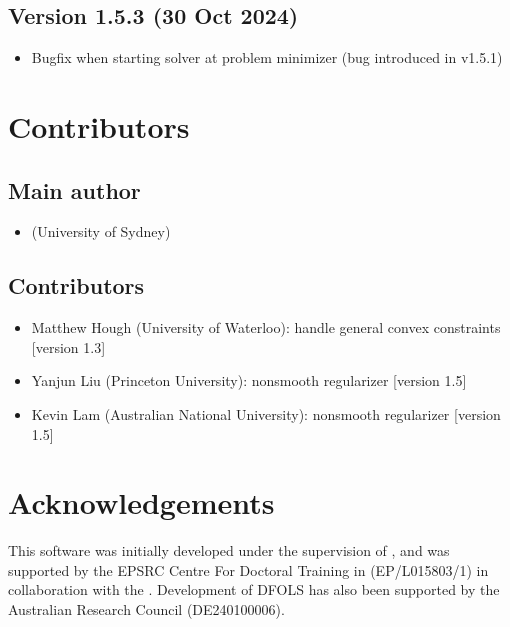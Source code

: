 \documentclass[letterpaper,10pt,english]{sphinxmanual}
\begin{document}
\section{Version 1.5.3 (30 Oct 2024)}
\label{\detokenize{history:version-1-5-3-30-oct-2024}}\begin{itemize}
\item {} 
\sphinxAtStartPar
Bugfix when starting solver at problem minimizer (bug introduced in v1.5.1)

\end{itemize}

\sphinxstepscope


\chapter{Contributors}
\label{\detokenize{contributors:contributors}}\label{\detokenize{contributors::doc}}

\section{Main author}
\label{\detokenize{contributors:main-author}}\begin{itemize}
\item {} 
\sphinxAtStartPar
{} (University of Sydney)

\end{itemize}


\section{Contributors}
\label{\detokenize{contributors:id1}}\begin{itemize}
\item {} 
\sphinxAtStartPar
Matthew Hough (University of Waterloo): handle general convex constraints {[}version 1.3{]}

\item {} 
\sphinxAtStartPar
Yanjun Liu (Princeton University): nonsmooth regularizer {[}version 1.5{]}

\item {} 
\sphinxAtStartPar
Kevin Lam (Australian National University): nonsmooth regularizer {[}version 1.5{]}

\end{itemize}


\chapter{Acknowledgements}
\label{\detokenize{index:acknowledgements}}
\sphinxAtStartPar
This software was initially developed under the supervision of , and was supported by the EPSRC Centre For Doctoral Training in  (EP/L015803/1) in collaboration with the . Development of DFO\sphinxhyphen{}LS has also been supported by the Australian Research Council (DE240100006).
\end{document}
